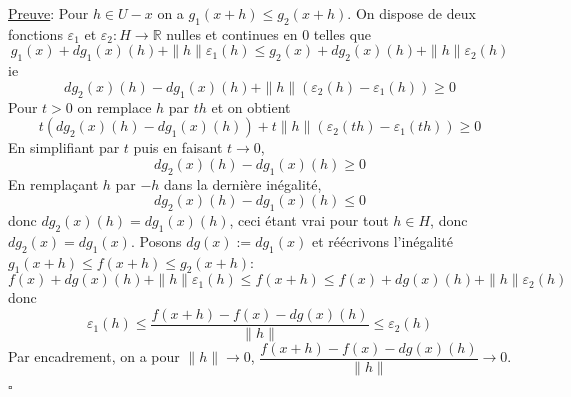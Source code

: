 \documentclass{fancybook}
\begin{document}
\underline{Preuve}: Pour $h\in U-x$ on a $g_1(x+h)\leq g_2(x+h)$. On dispose de deux fonctions $\varepsilon_1$ et $\varepsilon_2:H\to \mathbb R$ nulles et continues en $0$ telles que $$g_1(x)+dg_1(x)(h)+\|h\|\varepsilon_1(h)\leq g_2(x)+dg_2(x)(h)+\|h\|\varepsilon_2(h)$$
ie $$dg_2(x)(h) -dg_1(x)(h) + \|h\|(\varepsilon_2(h) -\varepsilon_1(h)) \geq 0$$
Pour $t>0$ on remplace $h$ par $th$ et on obtient 
$$t(dg_2(x)(h) -dg_1(x)(h)) + t\|h\|(\varepsilon_2(th) -\varepsilon_1(th)) \geq 0$$
En simplifiant par $t$ puis en faisant $t\to 0$,
$$dg_2(x)(h) -dg_1(x)(h) \geq 0$$
En remplaçant $h$ par $-h$ dans la dernière inégalité,
$$dg_2(x)(h) -dg_1(x)(h) \leq 0$$
donc $dg_2(x)(h) =dg_1(x)(h)$, ceci étant vrai pour tout $h\in H$, donc $dg_2(x)=dg_1(x)$.\newline \newline
Posons $dg(x):=dg_1(x)$ et réécrivons l'inégalité $g_1(x+h)\leq f(x+h)\leq g_2(x+h)$:
$$f(x)+dg(x)(h)+\|h\|\varepsilon_1(h) \leq f(x+h) \leq f(x)+dg(x)(h)+\|h\|\varepsilon_2(h)$$ 
donc 
$$ \varepsilon_1(h)\leq \dfrac{f(x+h)-f(x)-dg(x)(h)}{\|h\|}\leq \varepsilon_2(h)$$
Par encadrement, on a pour $\|h\|\to 0$, $\dfrac{f(x+h)-f(x)-dg(x)(h)}{\|h\|}\to 0 $. \newline
\null \hfill $\square$\\
\end{document}
